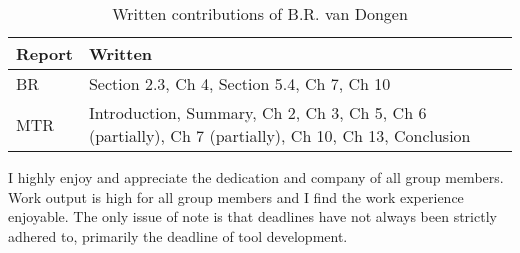 \begin{table}[h]
\caption{Written contributions of B.R. van Dongen}
\centering
\begin{tabular}{|p{}|p{}|}
\hline
 \textbf{Report}   & \textbf{Written}                                                                                             \\ \hline
BR  & Section 2.3, Ch 4, Section 5.4, Ch 7, Ch 10                                                           \\ \hline
MTR & Introduction, Summary, Ch 2, Ch 3, Ch 5, Ch 6 (partially), Ch 7 (partially), Ch 10, Ch 13, Conclusion \\ \hline
\end{tabular}
\end{table}

I highly enjoy and appreciate the dedication and company of all group members. Work output is high for all group members and I find the work experience enjoyable. The only issue of note is that deadlines have not always been strictly adhered to, primarily the deadline of tool development.


